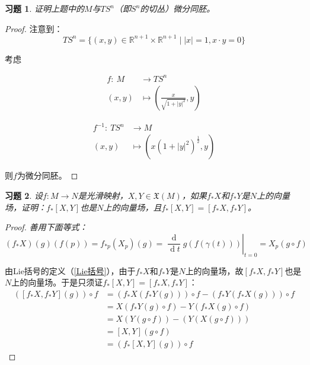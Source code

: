 \documentclass[winfonts,UTF8,c5size,a4paper,fancyhdr,hyperref,titlepage,nocap]{ctexart}
\newtheorem{xiti}{习题}
\theoremstyle{definition}
\theoremstyle{remark}
\numberwithin{equation}{subsection}
\newcommand{\Real}{\mathbb{R}}
\newcommand{\dt}{\frac{\operatorname{d}}{\operatorname{d}t}}
\newcommand{\Xf}[1]{\mathfrak{X}(#1)}
\newcommand{\local}[2]{\left.{#1}\right|_{#2}}%
\newcommand{\localt}[1]{\local{#1}{t=0}}%
\newcommand{\mapdes}[5]
  {
    \begin{align*}
      #1\colon\  #2 & \longrightarrow  #3 \\
            #4 & \mapsto  #5
    \end{align*}
  }
\begin{document}
\begin{xiti}
  证明上题中的$M$与$TS^n$（即$S^n$的切丛）微分同胚。
\end{xiti}
\begin{proof}
  注意到：
  \begin{equation*}
  TS^n=\{(x,y)\in\Real^{n+1}\times\Real^{n+1}\mid |x|=1, x\cdot y=0\}
  \end{equation*}

  考虑
  \begin{center}
  \parbox{0.4\linewidth}{\mapdes{f}{M}{TS^n}{(x,y)}{(\frac{x}{\sqrt{1+|y|^2}},y)}}
  \parbox{0.4\linewidth}{\mapdes{f^{-1}}{TS^n}{M}{(x,y)}{(x(1+|y|^2)^{\frac{1}{2}},y)}}
  \end{center}

  则$f$为微分同胚。
\end{proof}

\begin{xiti}
  设$f\colon M\to N$是光滑映射，$X,Y\in\Xf{M}$，如果$f_{\ast}X$和$f_{\ast}Y$是$N$上的向量场，证明：$f_{\ast}[X,Y]$也是$N$上的向量场，且$f_{\ast}[X,Y]=[f_{\ast}X,f_{\ast}Y]$。
\end{xiti}
\begin{proof}
  \emph{善用下面等式：}
   \begin{equation*}
     (f_{\ast}X)(g)(f(p))=f_{\ast p}(X_p)(g)=\localt{\dt g(f(\gamma(t)))}=X_p(g\circ f)
   \end{equation*}

  由Lie括号的定义（\ref{Lie括号}），由于$f_{\ast}X$和$f_{\ast}Y$是$N$上的向量场，故$[f_{\ast}X,f_{\ast}Y]$也是$N$上的向量场。于是只须证$f_{\ast}[X,Y]=[f_{\ast}X,f_{\ast}Y]$：
  \begin{align*}
    ([f_{\ast}X,f_{\ast}Y](g))\circ f&=(f_{\ast}X(f_{\ast}Y(g)))\circ f-(f_{\ast}Y(f_{\ast}X(g)))\circ f\\
                                 &=X(f_{\ast}Y(g)\circ f)-Y(f_{\ast}X(g)\circ f)\\
                                 &=X(Y(g\circ f))-(Y(X(g\circ f)))\\
                                 &=[X,Y](g\circ f)\\
                                 &=(f_{\ast}[X,Y](g))\circ f
  \end{align*}
\end{proof}
\end{document}
